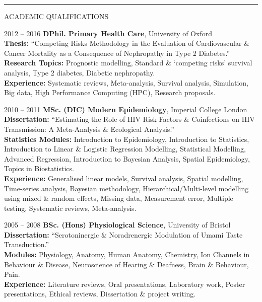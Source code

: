 \documentclass[10pt,a4paper]{article}
\begin{document}
\noindent\rule{\textwidth}{0.4pt}
\begin{cvlist}{ACADEMIC QUALIFICATIONS}

  \item[2012 -- 2016]
  \textbf{DPhil. Primary Health Care}, University of Oxford \\
  \textbf{Thesis:} ``Competing Risks Methodology in the Evaluation of Cardiovascular \& Cancer Mortality as a Consequence of Nephropathy in Type 2 Diabetes.'' \\
  \textbf{Research Topics:} Prognostic modelling, Standard \& `competing risks' survival analysis, Type 2 diabetes, Diabetic nephropathy. \\
  \textbf{Experience:} Systematic reviews, Meta-analysis, Survival analysis, Simulation, Big data, High Performance Computing (HPC), Research proposals.

  \item[2010 -- 2011]
  \textbf{MSc. (DIC) Modern Epidemiology}, Imperial College London \\
  \textbf{Dissertation:} ``Estimating the Role of HIV Risk Factors \& Coinfections on HIV Transmission: A Meta-Analysis \& Ecological Analysis.'' \\
  \textbf{Statistics Modules:} Introduction to Epidemiology, Introduction to Statistics, Introduction to Linear \& Logistic Regression Modelling, Statistical Modelling, Advanced Regression, Introduction to Bayesian Analysis, Spatial Epidemiology, Topics in Biostatistics. \\
  \textbf{Experience:} Generalised linear models, Survival analysis, Spatial modelling, Time-series analysis, Bayesian methodology, Hierarchical/Multi-level modelling using mixed \& random effects, Missing data, Measurement error, Multiple testing, Systematic reviews, Meta-analysis.

  \item[2005 -- 2008]
  \textbf{BSc. (Hons) Physiological Science}, University of Bristol \\
  \textbf{Dissertation:} ``Serotoninergic \& Noradrenergic Modulation of Umami Taste Transduction.'' \\
  \textbf{Modules:} Physiology, Anatomy, Human Anatomy, Chemistry, Ion Channels in Behaviour \& Disease, Neuroscience of Hearing \& Deafness, Brain \& Behaviour, Pain. \\
  \textbf{Experience:} Literature reviews, Oral presentations, Laboratory work, Poster presentations, Ethical reviews, Dissertation \& project writing.

\end{cvlist}
\end{document}
